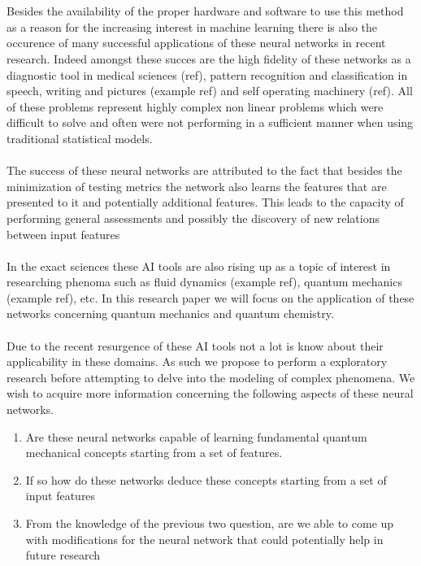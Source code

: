 \documentclass[12pt]{article}
\begin{document}
\\
\\
Besides the availability of the proper hardware and software to use this method as a reason for the increasing interest in machine learning there is also the occurence of many successful applications of these neural networks in recent research. Indeed amongst these succes are the high fidelity of these networks as a diagnostic tool in medical sciences (ref), pattern recognition and classification in speech, writing and pictures (example ref) and self operating machinery (ref). All of these problems represent highly complex non linear problems which were difficult to solve and often were not performing in a sufficient manner when using traditional statistical models.
\\
\\
The success of these neural networks are attributed to the fact that besides the minimization of testing metrics the network also learns the features that are presented to it and potentially additional features. This leads to the capacity of performing general assessments and possibly the discovery of new relations between input features
\\
\\
In the exact sciences these AI tools are also rising up as a topic of interest in researching phenoma such as fluid dynamics (example ref), quantum mechanics (example ref), etc. In this research paper we will focus on the application of these networks concerning quantum mechanics and quantum chemistry.
\\
\\
Due to the recent resurgence of these AI tools not a lot is know about their applicability in these domains. As such we propose to perform a exploratory research before attempting to delve into the modeling of complex phenomena. We wish to acquire more information concerning the following aspects of these neural networks.
\begin{enumerate}
	\item Are these neural networks capable of learning fundamental quantum mechanical concepts starting from a set of features.
	\item If so how do these networks deduce these concepts starting from a set of input features
	\item From the knowledge of the previous two question, are we able to come up with modifications for the neural network that could potentially help in future research 
\end{enumerate} 
\end{document}
